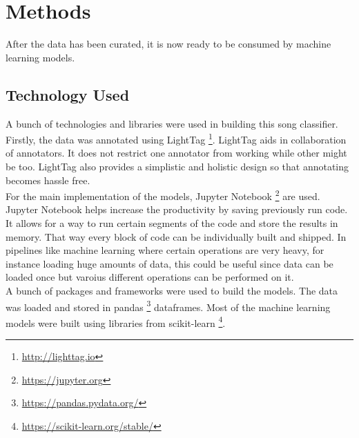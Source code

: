 \documentclass[11pt,a4paper]{article}
\begin{document}
\section{Methods}
\label{methods}
After the data has been curated, it is now ready to be consumed by machine learning models.

\subsection{Technology Used}
\label{techstack}
A bunch of technologies and libraries were used in building this song classifier. Firstly, the data was annotated using LightTag \footnote{\url{http://lighttag.io}}. LightTag aids in collaboration of annotators. It does not restrict one annotator from working while other might be too. LightTag also provides a simplistic and holistic design so that annotating becomes hassle free.\\
For the main implementation of the models, Jupyter Notebook \footnote{\url{https://jupyter.org}} are used. Jupyter Notebook helps increase the productivity by saving previously run code. It allows for a way to run certain segments of the code and store the results in memory. That way every block of code can be individually built and shipped. In pipelines like machine learning where certain operations are very heavy, for instance loading huge amounts of data, this could be useful since data can be loaded once but varoius different operations can be performed on it.\\
A bunch of packages and frameworks were used to build the models. The data was loaded and stored in pandas \footnote{\url{https://pandas.pydata.org/}} dataframes. Most of the machine learning models were built using libraries from scikit-learn \footnote{\url{https://scikit-learn.org/stable/}}.
\end{document}
